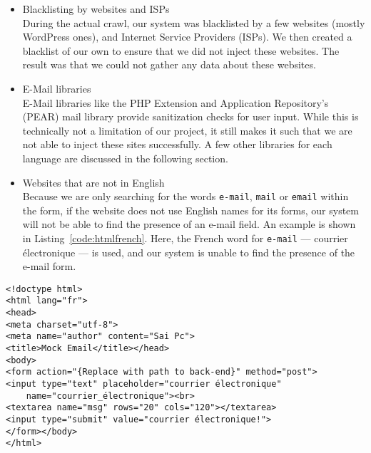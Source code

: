 \begin{itemize}
		\item Blacklisting by websites and ISPs\\
        During the actual crawl, our system was blacklisted by a few websites (mostly WordPress ones), and Internet Service Providers (ISPs). We then created a blacklist of our own to ensure that we did not inject these websites. The result was that we could not gather any data about these websites.
		
		\item E-Mail libraries\\
        E-Mail libraries like the PHP Extension and Application Repository's (PEAR) mail library provide sanitization checks for user input. While this is technically not a limitation of our project, it still makes it such that we are not able to inject these sites successfully.
        A few other libraries for each language are discussed in the following section.
        
        \item Websites that are not in English\\
        Because we are only searching for the words \texttt{e-mail}, \texttt{mail} or \texttt{email} within the form, if the website does not use English names for its forms, our system will not be able to find the presence of an e-mail field. An example is shown in Listing~\ref{code:htmlfrench}. Here, the French word for \texttt{e-mail} --- courrier électronique --- is used, and our system is unable to find the presence of the e-mail form.
	\end{itemize}
	
\begin{lstlisting}
<!doctype html>
<html lang="fr">
<head>
<meta charset="utf-8">
<meta name="author" content="Sai Pc">
<title>Mock Email</title></head>
<body>
<form action="{Replace with path to back-end}" method="post">
<input type="text" placeholder="courrier électronique" 
	name="courrier_électronique"><br>
<textarea name="msg" rows="20" cols="120"></textarea>
<input type="submit" value="courrier électronique!">
</form></body>
</html>
\end{lstlisting}
